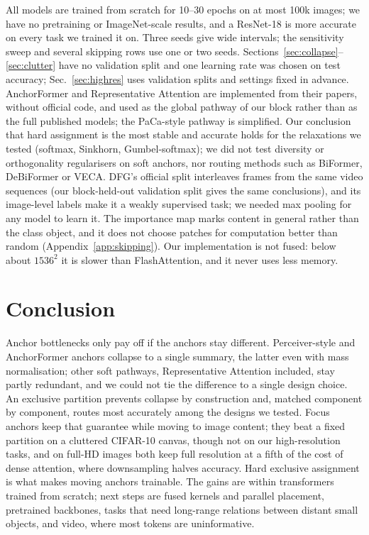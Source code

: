 \documentclass[runningheads]{llncs}
\begin{document}
All models are trained from scratch for 10--30 epochs on at most 100k images; we have no
pretraining or ImageNet-scale results, and a ResNet-18 is more accurate on every task we trained
it on. Three seeds
give wide intervals; the sensitivity sweep and several skipping rows use one or two seeds.
Sections~\ref{sec:collapse}--\ref{sec:clutter} have no validation split and one learning rate
was chosen on test accuracy; Sec.~\ref{sec:highres} uses validation splits and settings fixed in
advance. AnchorFormer and Representative Attention are implemented from their papers, without
official code, and used as the global pathway of our block rather than as the full published
models; the PaCa-style pathway is simplified. Our conclusion that hard assignment is the most
stable and accurate holds for the relaxations we tested (softmax, Sinkhorn, Gumbel-softmax); we
did not test diversity or orthogonality regularisers on soft anchors, nor routing methods such
as BiFormer, DeBiFormer or VECA. DFG's official split interleaves frames from the
same video sequences (our block-held-out validation split gives the same conclusions), and its
image-level labels make it a weakly supervised task; we needed max
pooling for any model to learn it. The importance map marks content in general rather than the
class object, and it does not choose patches for computation better than random
(Appendix~\ref{app:skipping}). Our implementation is not fused: below about $1536^2$ it is slower
than FlashAttention, and it never uses less memory.

\section{Conclusion}

Anchor bottlenecks only pay off if the anchors stay different. Perceiver-style and AnchorFormer
anchors collapse to a single summary, the latter even with mass normalisation; other soft
pathways, Representative Attention included, stay partly redundant, and we could not tie the
difference to a single design choice. An exclusive partition prevents collapse by construction and, matched
component by component, routes most accurately among the designs we tested. Focus anchors keep
that guarantee while moving to image content; they beat a fixed partition on a cluttered CIFAR-10
canvas, though not on our high-resolution tasks, and on full-HD images both keep full resolution
at a fifth of the cost of dense attention, where downsampling halves accuracy. Hard exclusive assignment is what makes moving
anchors trainable. The gains are within transformers trained from scratch; next steps are fused
kernels and parallel placement, pretrained backbones, tasks that need long-range relations
between distant small objects, and video, where most tokens are uninformative.
\end{document}
